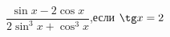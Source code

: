 \begin{ex}[type=calculate_expression]
	\begin{condition}
		\( \dfrac{\sin x - 2\cos x}{2\sin^3x+\cos^3x} \),\quad если \( \tg x = 2 \)
	\end{condition}
\end{ex}